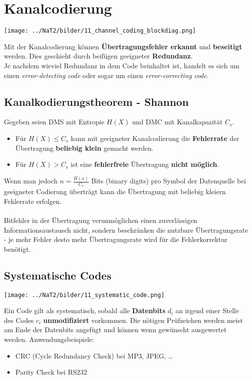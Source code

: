 \section{Kanalcodierung } 
\begin{center}
	\texttt{[image: ../NaT2/bilder/11\_channel\_coding\_blockdiag.png]}
\end{center}

Mit der Kanalcodierung können \textbf{Übertragungsfehler erkannt} und \textbf{beseitigt} werden.
Dies geschieht durch beifügen geeigneter \textbf{Redundanz}. \\
Je nachdem wieviel Redundanz in dem Code beinhaltet ist, handelt es sich um einen \textit{error-detecting
code} oder sogar um einen \textit{error-correcting code}.

\subsection{Kanalkodierungstheorem - Shannon }
Gegeben seien DMS mit Entropie $H(X)$ und DMC mit Kanalkapazität $C_s$. 

\begin{itemize}
  	\item Für $H(X) \leq C_s$ kann mit geeigneter Kanalcodierung die \textbf{Fehlerrate} der
  	Übertragung \textbf{beliebig klein} gemacht werden. 
	\item Für $H(X) > C_s$ ist eine \textbf{fehlerfreie} Übertragung \textbf{nicht möglich}.
\end{itemize}
Wenn man jedoch $n = \frac{H(x)}{C_s}$ Bits (binary digits) pro Symbol der Datenquelle bei
geeigneter Codierung überträgt kann die Übertragung mit beliebig kleiern Fehlerrate erfolgen. \\ \\
Bitfehler in der Übertragung verunmöglichen einen zuverlässigen Informationsaustausch nicht,
sondern beschränken die nutzbare Übertragungsrate - je mehr Fehler desto mehr Übertragungsrate
wird für die Fehlerkorrektur benötigt. \\

\subsection{Systematische Codes}
\begin{minipage}{5.5cm}
	\texttt{[image: ../NaT2/bilder/11\_systematic\_code.png]}
\end{minipage}
\begin{minipage}{12.8cm}
	Ein Code gilt als systematisch, sobald alle \textbf{Datenbits} $d_i$ an irgend einer Stelle des Codes $c_i$
	\textbf{unmodifiziert} vorkommen. Die nötigen Prüfzeichen werden meist am Ende
	der Datenbits angefügt und können wenn gewünscht ausgewertet werden. Anwendungsbeispiele:
	\begin{itemize}
    	\item CRC (Cycle Redundancy Check) bei MP3, JPEG, \ldots
    	\item Parity Check bei RS232
  	\end{itemize}	
\end{minipage} 


